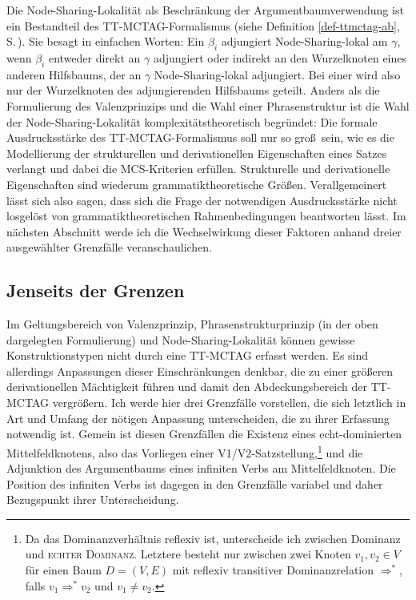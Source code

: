 Die Node-Sharing-Lokalität als Beschränkung der Argumentbaumverwendung ist ein Bestandteil des TT-MCTAG-Formalismus (siehe Definition \ref{def-ttmctag-ab}, S.\,\pageref{def-ttmctag-ab}). Sie besagt in einfachen Worten: Ein  $\beta_i$ adjungiert Node-Sharing-lokal am  $\gamma$, wenn $\beta_i$ entweder direkt an $\gamma$ adjungiert oder indirekt an den Wurzelknoten eines anderen Hilfsbaums, der an $\gamma$ Node-Sharing-lokal adjungiert. Bei einer  wird also nur der Wurzelknoten des adjungierenden Hilfsbaums geteilt.  
%
Anders als die Formulierung des Valenzprinzips und die Wahl einer Phrasenstruktur ist die Wahl der Node-Sharing-Lokalität komplexitätstheoretisch begründet: Die formale Ausdrucksstärke des TT-MCTAG-Formalismus soll nur so gro\ss\ sein, wie es die Modellierung der strukturellen und derivationellen Eigenschaften eines Satzes verlangt und dabei die MCS-Kriterien erfüllen. Strukturelle und derivationelle Eigenschaften sind wiederum grammatiktheoretische Grö\ss en. Verallgemeinert lässt sich also sagen, dass sich die Frage der notwendigen Ausdrucksstärke nicht losgelöst von grammatiktheoretischen Rahmenbedingungen beantworten lässt. Im nächsten Abschnitt werde ich die Wechselwirkung dieser Faktoren anhand dreier ausgewählter Grenzfälle veranschaulichen. 


\subsection{Jenseits der Grenzen}

Im Geltungsbereich von Valenzprinzip, Phrasenstrukturprinzip (in der oben dargelegten Formulierung) und Node-Sharing-Lokalität können gewisse Konstruktionstypen nicht durch eine TT-MCTAG erfasst werden. Es sind allerdings Anpassungen dieser Einschränkungen denkbar, die zu einer größeren derivationellen Mächtigkeit führen und damit den Abdeckungsbereich der TT-MCTAG vergrößern. Ich werde hier drei Grenzfälle vorstellen, die sich letztlich in Art und Umfang der nötigen Anpassung unterscheiden, die zu ihrer Erfassung notwendig ist. 
%
Gemein ist diesen Grenzfällen die Existenz eines echt-dominierten Mittelfeldknotens, also das Vorliegen einer V1/V2-Satzstellung,\footnote{Da das Dominanzverhältnis reflexiv ist, unterscheide ich zwischen Dominanz und \textsc{echter Dominanz}. Letztere besteht nur zwischen zwei Knoten $v_1, v_2 \in V$ für einen Baum $D = (V,E)$ mit reflexiv transitiver Dominanzrelation $\Rightarrow^*$, falls $v_1 \Rightarrow^* v_2$ und $v_1 \neq v_2$.} und die Adjunktion des Argumentbaums eines infiniten Verbs am Mittelfeldknoten. Die Position des infiniten Verbs ist dagegen in den Grenzfälle variabel und daher Bezugspunkt ihrer Unterscheidung. 

